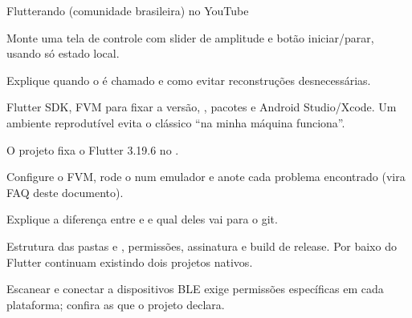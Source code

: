 \begin{paraestudar}
  \item {}
  \item Flutterando (comunidade brasileira) no YouTube
\end{paraestudar}

\begin{pratique}
  \item Monte uma tela de controle com slider de amplitude e botão iniciar/parar, usando só estado local.
  \item Explique quando o  é chamado e como evitar reconstruções desnecessárias.
\end{pratique}

Flutter SDK, FVM para fixar a versão, , pacotes e Android Studio/Xcode. Um ambiente reprodutível evita o clássico “na minha máquina funciona”.

\begin{noproduto}
O projeto fixa o Flutter 3.19.6 no .
\end{noproduto}

\begin{paraestudar}
  \item {}
  \item {}
\end{paraestudar}

\begin{pratique}
  \item Configure o FVM, rode o  num emulador e anote cada problema encontrado (vira FAQ deste documento).
  \item Explique a diferença entre  e  e qual deles vai para o git.
\end{pratique}

Estrutura das pastas  e , permissões, assinatura e build de release. Por baixo do Flutter continuam existindo dois projetos nativos.

\begin{noproduto}
Escanear e conectar a dispositivos BLE exige permissões específicas em cada plataforma; confira as que o projeto declara.
\end{noproduto}

\begin{paraestudar}
  \item {}
\end{paraestudar}

